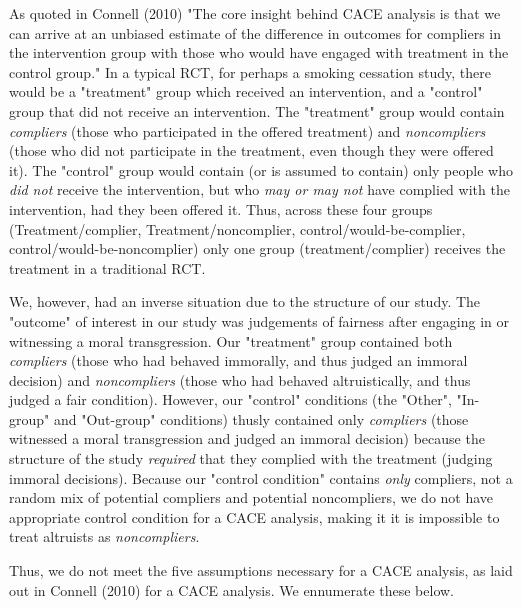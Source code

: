 \documentclass[12pt,]{article}
\begin{document}
As quoted in Connell (2010) "The core insight behind CACE analysis is that we can arrive at an unbiased estimate of the difference in outcomes for compliers in the intervention group with those who would have engaged with treatment in the control group." In a typical RCT, for perhaps a smoking cessation study, there would be a "treatment" group which received an intervention, and a "control" group that did not receive an intervention. The "treatment" group would contain \emph{compliers} (those who participated in the offered treatment) and \emph{noncompliers} (those who did not participate in the treatment, even though they were offered it). The "control" group would contain (or is assumed to contain) only people who \emph{did not} receive the intervention, but who \emph{may or may not} have complied with the intervention, had they been offered it. Thus, across these four groups (Treatment/complier, Treatment/noncomplier, control/would-be-complier, control/would-be-noncomplier) only one group (treatment/complier)  receives the treatment in a traditional RCT. 

We, however, had an inverse situation due to the structure of our study. The "outcome" of interest in our study was judgements of fairness after engaging in or witnessing a moral transgression. Our "treatment" group contained both \emph{compliers} (those who had behaved immorally, and thus judged an immoral decision) and \emph{noncompliers} (those who had behaved altruistically, and thus judged a fair condition). However, our "control" conditions (the "Other", "In-group" and "Out-group" conditions) thusly contained only \emph{compliers} (those witnessed a moral transgression and judged an immoral decision) because the structure of the study \emph{required} that they complied with the treatment (judging immoral decisions). Because our "control condition" contains \emph{only} compliers, not a random mix of potential compliers and potential noncompliers, we do not have appropriate control condition for a CACE analysis, making it it is impossible to treat altruists as \emph{noncompliers}. 

Thus, we do not meet the five assumptions necessary for a CACE analysis, as laid out in Connell (2010) for a CACE analysis. We ennumerate these below. 
\end{document}
